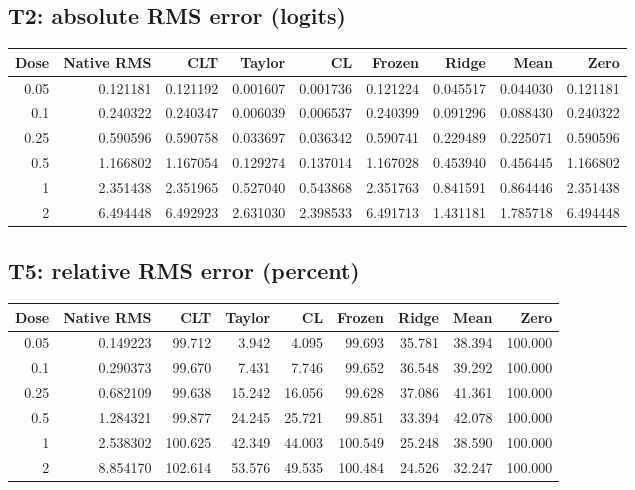 \subsection{T2: absolute RMS error (logits)}
\begin{center}\scriptsize
\begin{tabular}{rrrrrrrrr}
\toprule Dose & Native RMS & CLT & Taylor & CL & Frozen & Ridge & Mean & Zero\\\midrule
0.05 & 0.121181 & 0.121192 & 0.001607 & 0.001736 & 0.121224 & 0.045517 & 0.044030 & 0.121181\\
0.1 & 0.240322 & 0.240347 & 0.006039 & 0.006537 & 0.240399 & 0.091296 & 0.088430 & 0.240322\\
0.25 & 0.590596 & 0.590758 & 0.033697 & 0.036342 & 0.590741 & 0.229489 & 0.225071 & 0.590596\\
0.5 & 1.166802 & 1.167054 & 0.129274 & 0.137014 & 1.167028 & 0.453940 & 0.456445 & 1.166802\\
1 & 2.351438 & 2.351965 & 0.527040 & 0.543868 & 2.351763 & 0.841591 & 0.864446 & 2.351438\\
2 & 6.494448 & 6.492923 & 2.631030 & 2.398533 & 6.491713 & 1.431181 & 1.785718 & 6.494448\\
\bottomrule\end{tabular}\end{center}
\subsection{T5: relative RMS error (percent)}
\begin{center}\scriptsize
\begin{tabular}{rrrrrrrrr}
\toprule Dose & Native RMS & CLT & Taylor & CL & Frozen & Ridge & Mean & Zero\\\midrule
0.05 & 0.149223 & 99.712 & 3.942 & 4.095 & 99.693 & 35.781 & 38.394 & 100.000\\
0.1 & 0.290373 & 99.670 & 7.431 & 7.746 & 99.652 & 36.548 & 39.292 & 100.000\\
0.25 & 0.682109 & 99.638 & 15.242 & 16.056 & 99.628 & 37.086 & 41.361 & 100.000\\
0.5 & 1.284321 & 99.877 & 24.245 & 25.721 & 99.851 & 33.394 & 42.078 & 100.000\\
1 & 2.538302 & 100.625 & 42.349 & 44.003 & 100.549 & 25.248 & 38.590 & 100.000\\
2 & 8.854170 & 102.614 & 53.576 & 49.535 & 100.484 & 24.526 & 32.247 & 100.000\\
\bottomrule\end{tabular}\end{center}
